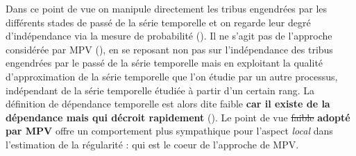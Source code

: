 Dans ce point de vue on manipule directement les tribus engendrées par les différents stades de passé de la série temporelle et on regarde leur degré d'indépendance via la mesure de probabilité (\edited). Il ne s'agit pas de l'approche considérée par MPV (\edited), en se reposant non pas sur l'indépendance des tribus engendrées par le passé de la série temporelle mais en exploitant la qualité d'approximation de la série temporelle que l'on étudie par un autre processus, indépendant de la série temporelle étudiée à partir d'un certain rang. La définition de dépendance temporelle est alors dite \og faible \fg \textbf{car il existe de la dépendance mais qui décroit rapidement} (\edited). Le point de vue \textcolor{flatuicolors_rose}{\sout{{faible}}} \textbf{adopté par MPV} offre un comportement plus sympathique pour l'aspect \emph{local} dans l'estimation de la régularité : qui est le coeur de l'approche de MPV.
